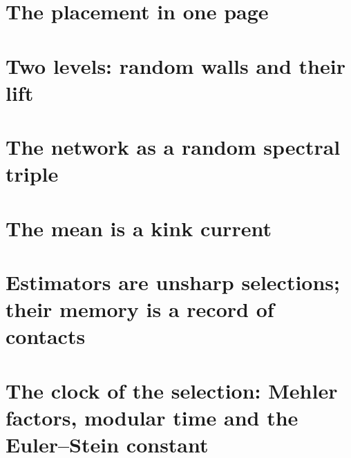 \documentclass[11pt]{article}
\theoremstyle{plain}
\theoremstyle{definition}\newtheorem{definition}[theorem]{Definition}\newtheorem{remark}[theorem]{Remark}
\begin{document}
\begin{abstract}
(viii) in the simplest framing (input slots as vertices, layers as quadratic forms, tokens as Hermite quanta) the
mean of every neuron is twice the trace of its quadratic form, layer two's form is the graph of two-step walks through
the hidden layer, cumulants are walk sums on the hidden codegree graph, the Gaussian closure is the two-token walk with
exact contacts, and the third-cumulant memory is first-order exchange whose hub coefficients are themselves walks;
(ix) the quantum-cut (Kikuchi) sparsifiers of Basu--Brakensiek--Kothari--Putterman are Schur--Weyl duality in action, the network
carries the bosonic counterpart (Howe duality, with the radial foliation) and the hard-core one (gates), the memory has no redundancy
(every hub a bridge), and a higher tier with random dynamics acts on the gates through wall currents: the gate covariance is the
integrated Gram of wall currents, localization freezes deep gates first, and the two tiers form a non-commuting square.
Every statement is labelled as proved, known (with a reference), or conjectural; the identities are checked by
accompanying scripts.
\end{abstract}
\tableofcontents
\section{The placement in one page}

\section{Two levels: random walls and their lift}

\section{The network as a random spectral triple}

\section{The mean is a kink current}

\section{Estimators are unsharp selections; their memory is a record of contacts}

\section{The clock of the selection: Mehler factors, modular time and the Euler--Stein constant}

\end{document}
